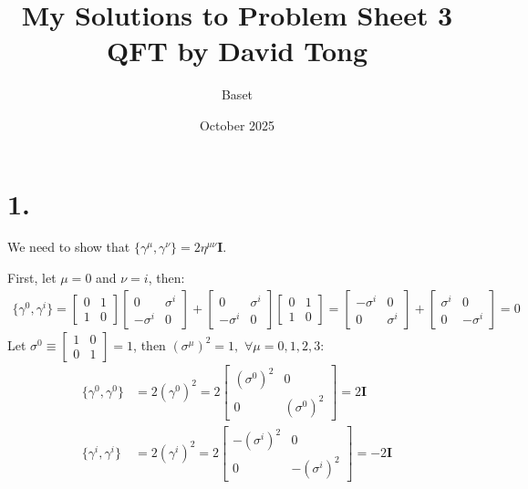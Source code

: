 \documentclass{article}
\title{My Solutions to Problem Sheet 3 QFT by David Tong}
\author{Baset}
\date{October 2025}
\begin{document}
\maketitle
\section*{1.}
We need to show that $\{\gamma^\mu,\gamma^\nu \}=2\eta^{\mu\nu}\mathbf{I}$.

First, let $\mu=0$ and $\nu=i$, then:
\begin{equation}
    \begin{split}
      \{\gamma^0,\gamma^i \}=\begin{bmatrix}
          0 & 1 \\ 1 & 0
      \end{bmatrix}  \begin{bmatrix}
          0 & \sigma^i \\ -\sigma^i & 0
      \end{bmatrix}  + \begin{bmatrix}
          0 & \sigma^i \\ -\sigma^i & 0
      \end{bmatrix} \begin{bmatrix}
          0 & 1 \\ 1 & 0
      \end{bmatrix}  =  \begin{bmatrix}
          -\sigma^i & 0 \\ 0 & \sigma^i
      \end{bmatrix} + \begin{bmatrix}
          \sigma^i & 0 \\ 0 & -\sigma^i
      \end{bmatrix}=0
    \end{split}
\end{equation}
Let $\sigma^0\equiv \begin{bmatrix}
          1 & 0 \\ 0 & 1
      \end{bmatrix} =1$, then $(\sigma^\mu)^2=1,$ $\forall \mu=0,1,2,3$:
\begin{equation}
    \begin{split}
        \{\gamma^0,\gamma^0 \}&=2(\gamma^0)^2=2\begin{bmatrix}
            (\sigma^0)^2 & 0\\ 0 & (\sigma^0)^2
        \end{bmatrix}=2\mathbf{I}\\
        \{\gamma^i,\gamma^i \}&=2(\gamma^i)^2=2\begin{bmatrix}
            -(\sigma^i)^2 & 0\\ 0 & -(\sigma^i)^2
        \end{bmatrix}=-2\mathbf{I}
    \end{split}
\end{equation}
\end{document}

